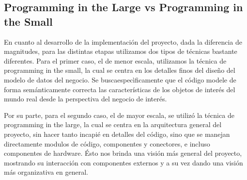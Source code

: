 \subsection{Programming in the Large vs Programming in the Small}
En cuanto al desarrollo de la implementaci\'on del proyecto, dada la diferencia de magnitudes, para las distintas etapas utilizamos dos tipos de t\'ecnicas bastante diferentes. Para el primer caso, el de menor escala, utilizamos la t\'ecnica de programming in the small, la cual se centra en los detalles finos del dise\~no del modelo de datos del negocio. Se buscaespecìficamente que el c\'odigo modele de forma sem\'anticamente correcta las caracter\'isticas de los objetos de inter\'es del mundo real desde la perspectiva del negocio de inter\'es.

Por su parte, para el segundo caso, el de mayor escala, se utiliz\'o la t\'ecnica de programming in the large, la cual se centra en la arquitectura general del proyecto, sin hacer tanto incapi\'e en detalles del c\'odigo, sino que se manejan directamente modulos de c\'odigo, componentes y conectores, e incluso componentes de hardware. Ésto nos brinda una visi\'on m\'as general del proyecto, mostrando su interacci\'on con componentes externos y a su vez dando una visi\'on m\'as organizativa en general.